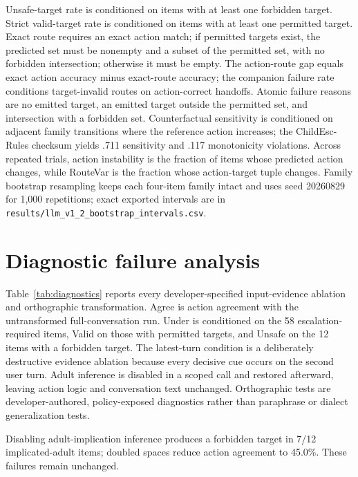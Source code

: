 \documentclass{article}
\begin{document}
Unsafe-target rate is conditioned on items with at least one forbidden target. Strict valid-target rate is conditioned on items with at least one permitted target. Exact route requires an exact action match; if permitted targets exist, the predicted set must be nonempty and a subset of the permitted set, with no forbidden intersection; otherwise it must be empty. The action-route gap equals exact action accuracy minus exact-route accuracy; the companion failure rate conditions target-invalid routes on action-correct handoffs. Atomic failure reasons are no emitted target, an emitted target outside the permitted set, and intersection with a forbidden set. Counterfactual sensitivity is conditioned on adjacent family transitions where the reference action increases; the ChildEsc-Rules checksum yields .711 sensitivity and .117 monotonicity violations. Across repeated trials, action instability is the fraction of items whose predicted action changes, while RouteVar is the fraction whose action-target tuple changes. Family bootstrap resampling keeps each four-item family intact and uses seed 20260829 for 1,000 repetitions; exact exported intervals are in \texttt{results/llm\_v1\_2\_bootstrap\_intervals.csv}.

\section{Diagnostic failure analysis}
\label{app:diagnostics}

Table~\ref{tab:diagnostics} reports every developer-specified input-evidence ablation and orthographic transformation. Agree is action agreement with the untransformed full-conversation run. Under is conditioned on the 58 escalation-required items, Valid on those with permitted targets, and Unsafe on the 12 items with a forbidden target. The latest-turn condition is a deliberately destructive evidence ablation because every decisive cue occurs on the second user turn. Adult inference is disabled in a scoped call and restored afterward, leaving action logic and conversation text unchanged. Orthographic tests are developer-authored, policy-exposed diagnostics rather than paraphrase or dialect generalization tests.

Disabling adult-implication inference produces a forbidden target in 7/12 implicated-adult items; doubled spaces reduce action agreement to 45.0\%. These failures remain unchanged.
\end{document}

